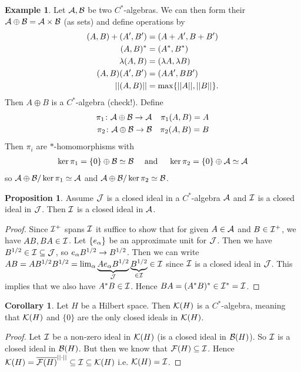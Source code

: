 \documentclass[10pt,english,a4paper]{article}
\theoremstyle{definition}
\newtheorem*{corollary}{Corollary}
\newtheorem*{proposition}{Proposition}
\newtheorem*{example}{Example}
\let\emph\relax %
\begin{document}
\begin{example}
Let $\mathcal{A}, \mathcal{B}$ be two $C^*$-algebras. We can then form their
\emph{direct sum} $\mathcal{A} \oplus \mathcal{B} = \mathcal{A} \times \mathcal{B}$ (as sets) and 
define operations by 
\begin{align*}
    (A,B)+(A',B') &= (A+A',B+B') \\
    (A,B)^* &= (A^*, B^*) \\
    \lambda (A,B) &= (\lambda A, \lambda B) \\
    (A,B)(A',B') &= (AA', BB') \\
    ||(A,B)|| &= \max\{||A||, ||B||\}.
\end{align*}    
Then $A\oplus B$ is a $C^*$-algebra (check!).
Define
\begin{align*}
    \pi_1 \colon \mathcal{A}\oplus \mathcal{B} \to \mathcal{A} && \pi_{1} (A,B) = A \\
    \pi_2 \colon \mathcal{A}\oplus \mathcal{B} \to \mathcal{B} && \pi_{2} (A,B) = B \\
\end{align*}
Then $\pi_i$ are $*$-homomorphisms with 
\begin{align*}
    \ker \pi_1 = \{0\} \oplus \mathcal{B} \simeq \mathcal{B} \quad\text{ and } \quad   
    \ker \pi_2 = \{0\} \oplus \mathcal{A} \simeq \mathcal{A}    
\end{align*}
so $\mathcal{A} \oplus\mathcal{B} /\ker \pi_1 \simeq \mathcal{A}$ and $\mathcal{A} \oplus\mathcal{B} /\ker \pi_2 \simeq
\mathcal{B}$.

\end{example}

\begin{proposition}
    Assume $\mathcal{J}$ is a closed ideal in a $C^*$-algebra $\mathcal{A}$ and 
$\mathcal{I}$ is a closed ideal in $\mathcal{J}$. Then $\mathcal{I}$ is a closed ideal in $\mathcal{A}$.
\end{proposition}
\begin{proof}
    Since $\mathcal{I}^+$ spans $\mathcal{I}$ it suffice to show that for given $A\in \mathcal{A}$ and 
$B \in \mathcal{I}^+$, we have $AB, BA \in \mathcal{I}$. Let 
$\{e_{\alpha}\}$ be an approximate unit for $\mathcal{J}$. Then we have 
$B^{1/2} \in \mathcal{I} \subseteq \mathcal{J}$, so $e_{\alpha}B^{1/2} \to B^{1/2}$.
Then we can write $AB = AB^{1/2}B^{1/2} = 
\lim_{\alpha} \underbrace{Ae_{\alpha}B^{1/2}}_{
\mathcal{J}} \underbrace{B^{1/2}}_{\in \mathcal{I}} \in \mathcal{I} $ since $\mathcal{I}$ is a closed ideal in $\mathcal{J}$.
This implies that we also have $A^*B \in \mathcal{I}$. Hence $BA = (A^*B)^* \in \mathcal{I}^* = \mathcal{I}$.


\end{proof}

\begin{corollary}
    Let $H$ be a Hilbert space. Then $\mathcal{K}(H)$ is a \emph{simple} $C^*$-algebra, meaning 
that $\mathcal{K}(H)$ and $\{0\}$ are the only closed ideals in $\mathcal{K}(H)$.
\end{corollary}
\begin{proof}
    Let $\mathcal{I}$ be a non-zero ideal in $\mathcal{K}(H)$ (is a closed ideal in $\mathcal{B}(H)$). 
    So $\mathcal{I}$ is a closed ideal in $\mathcal{B}(H)$. But then we know that 
    $\mathcal{F}(H) \subseteq \mathcal{I}$. Hence $\mathcal{K}(H)  = \overline{\mathcal{F}(H)}^{||\cdot||} \subseteq
    \mathcal{I} \subseteq \mathcal{K}(H)$ i.e. $\mathcal{K}(H) = \mathcal{I}$.
\end{proof}
\end{document}

